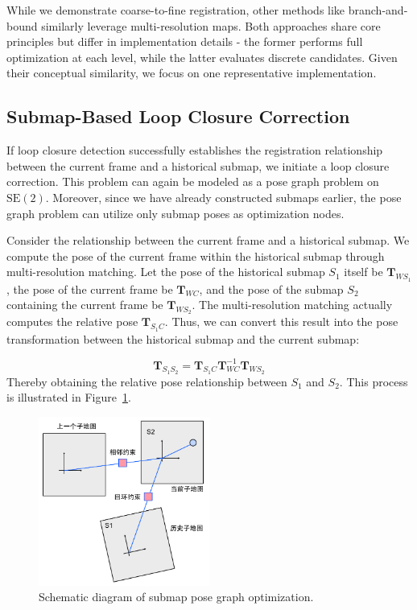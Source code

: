 While we demonstrate coarse-to-fine registration, other methods like branch-and-bound \cite{Hess2016} similarly leverage multi-resolution maps. Both approaches share core principles but differ in implementation details - the former performs full optimization at each level, while the latter evaluates discrete candidates. Given their conceptual similarity, we focus on one representative implementation.

\subsection{Submap-Based Loop Closure Correction}  
If loop closure detection successfully establishes the registration relationship between the current frame and a historical submap, we initiate a loop closure correction. This problem can again be modeled as a pose graph problem on $\mathrm{SE}(2)$. Moreover, since we have already constructed submaps earlier, the pose graph problem can utilize only submap poses as optimization nodes.

Consider the relationship between the current frame and a historical submap. We compute the pose of the current frame within the historical submap through multi-resolution matching. Let the pose of the historical submap $S_1$ itself be $\bm{T}_{W S_1}$, the pose of the current frame be $\bm{T}_{WC}$, and the pose of the submap $S_2$ containing the current frame be $\bm{T}_{W S_2}$. The multi-resolution matching actually computes the relative pose $\bm{T}_{S_1 C}$. Thus, we can convert this result into the pose transformation between the historical submap and the current submap:

\begin{equation}\label{key}
	\bm{T}_{S_1 S_2} = \bm{T}_{S_1 C} \bm{T}_{WC}^{-1} \bm{T}_{W S_2}
\end{equation}
Thereby obtaining the relative pose relationship between $S_1$ and $S_2$. This process is illustrated in Figure~\ref{fig:submap-pose-graph}.

\begin{figure}[!htp]
	\centering
	\includegraphics[width=0.5\textwidth]{resources/2d-lidar-mapping/submap-pose-graph.pdf}
	\caption{Schematic diagram of submap pose graph optimization.}
	\label{fig:submap-pose-graph}
\end{figure}

